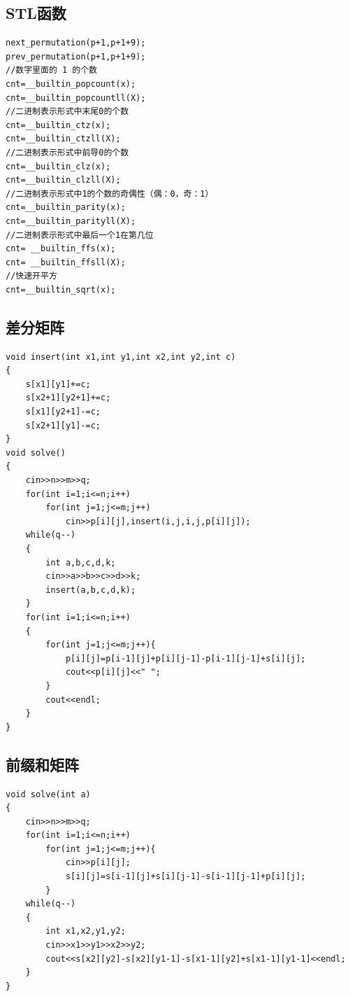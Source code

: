 \documentclass[12pt, a4paper, oneside]{ctexart}
\begin{document}
\subsection{STL函数} 
\begin{lstlisting}
next_permutation(p+1,p+1+9);
prev_permutation(p+1,p+1+9);
//数字里面的 1 的个数
cnt=__builtin_popcount(x);
cnt=__builtin_popcountll(X);
//二进制表示形式中末尾0的个数
cnt=__builtin_ctz(x);
cnt=__builtin_ctzll(X);
//二进制表示形式中前导0的个数
cnt=__builtin_clz(x);
cnt=__builtin_clzll(X);
//二进制表示形式中1的个数的奇偶性（偶：0，奇：1）
cnt=__builtin_parity(x);
cnt=__builtin_parityll(X);
//二进制表示形式中最后一个1在第几位
cnt= __builtin_ffs(x);
cnt= __builtin_ffsll(X);
//快速开平方
cnt=__builtin_sqrt(x);
\end{lstlisting}


\newpage
\subsection{差分矩阵 } 
\begin{lstlisting}
void insert(int x1,int y1,int x2,int y2,int c)
{
	s[x1][y1]+=c;
	s[x2+1][y2+1]+=c;
	s[x1][y2+1]-=c;
	s[x2+1][y1]-=c;
}
void solve()
{
	cin>>n>>m>>q;
	for(int i=1;i<=n;i++)
		for(int j=1;j<=m;j++)
			cin>>p[i][j],insert(i,j,i,j,p[i][j]);
	while(q--)
	{
		int a,b,c,d,k;
		cin>>a>>b>>c>>d>>k;
		insert(a,b,c,d,k);
	}
	for(int i=1;i<=n;i++)
	{
		for(int j=1;j<=m;j++){
			p[i][j]=p[i-1][j]+p[i][j-1]-p[i-1][j-1]+s[i][j];
			cout<<p[i][j]<<" ";
		}
		cout<<endl;
	}
}
\end{lstlisting}



\newpage
\subsection{前缀和矩阵  } 
\begin{lstlisting}
void solve(int a)
{
	cin>>n>>m>>q;
	for(int i=1;i<=n;i++)
		for(int j=1;j<=m;j++){
			cin>>p[i][j];
			s[i][j]=s[i-1][j]+s[i][j-1]-s[i-1][j-1]+p[i][j];
		}
	while(q--)
	{
		int x1,x2,y1,y2;
		cin>>x1>>y1>>x2>>y2;
		cout<<s[x2][y2]-s[x2][y1-1]-s[x1-1][y2]+s[x1-1][y1-1]<<endl;
	}
}
\end{lstlisting}
\end{document}
